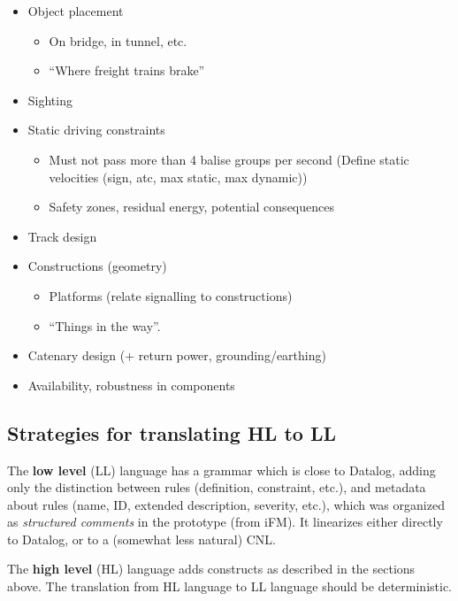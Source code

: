\documentclass[]{article}
\providecommand{\tightlist}{%
  \setlength{\itemsep}{0pt}\setlength{\parskip}{0pt}}
\begin{document}
\begin{itemize}
\item
  Object placement

  \begin{itemize}
  \tightlist
  \item
    On bridge, in tunnel, etc.
  \item
    ``Where freight trains brake''
  \end{itemize}
\item
  Sighting
\item
  Static driving constraints

  \begin{itemize}
  \tightlist
  \item
    Must not pass more than 4 balise groups per second (Define static
    velocities (sign, atc, max static, max dynamic))
  \item
    Safety zones, residual energy, potential consequences
  \end{itemize}
\item
  Track design
\item
  Constructions (geometry)

  \begin{itemize}
  \tightlist
  \item
    Platforms (relate signalling to constructions)
  \item
    ``Things in the way''.
  \end{itemize}
\item
  Catenary design (+ return power, grounding/earthing)
\item
  Availability, robustness in components
\end{itemize}

\subsection{Strategies for translating HL to
LL}\label{strategies-for-translating-hl-to-ll}

The \textbf{low level} (LL) language has a grammar which is close to
Datalog, adding only the distinction between rules (definition,
constraint, etc.), and metadata about rules (name, ID, extended
description, severity, etc.), which was organized as \emph{structured
comments} in the prototype (from iFM). It linearizes either directly to
Datalog, or to a (somewhat less natural) CNL.

The \textbf{high level} (HL) language adds constructs as described in
the sections above. The translation from HL language to LL language
should be deterministic.
\end{document}
